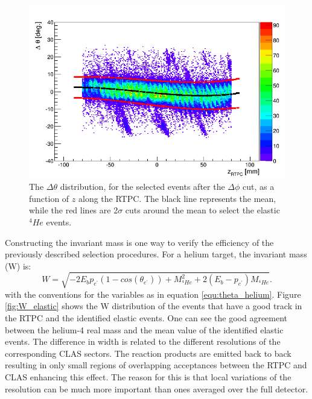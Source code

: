 \begin{figure}[tbp]
\centering
\includegraphics[scale=0.370]{fig_rtpc/delta_theta_z.png}
\caption[]{The $\Delta \theta$ distribution, for the selected events after the $\Delta \phi$ cut, as a function of $z$ along the RTPC. The black line represents the mean, while the red lines are 2$\sigma$ cuts around the mean to select the elastic $^4He$ events. } 
\label{fig:delta_theta_elastic}
\end{figure} 


Constructing the invariant mass is one way to verify the efficiency of the previously described selection procedures. For a helium target, the invariant mass (W) is:\\
\begin{equation}
 W = \sqrt{-2E_{b}p_{e^{'}}(1-cos(\theta_{e^{'}})) + M_{^{4}He}^2 + 2(E_{b}-p_{e^{'}}) M_{^{4}He}}.
\end{equation}
with the conventions for the variables as in equation \ref{equ:theta_helium}.  
Figure \ref{fig:W_elastic} shows the W distribution of the events that have a 
good track in the RTPC and the identified elastic events. One can see the good 
agreement between the helium-4 real mass and the mean value of the identified 
elastic events. The difference in width is related to the different resolutions 
of the corresponding CLAS sectors. The reaction products are emitted back to 
back resulting in only small regions of overlapping acceptances between the 
RTPC and CLAS enhancing this effect. The reason for this is that local 
variations of the resolution can be much more important than ones averaged over 
the full detector.
\\

